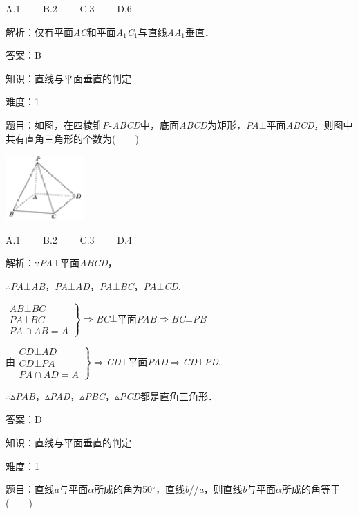 \documentclass{article} %
\begin{document}
A.1　　 B.2　　 C.3　　 D.6

解析：仅有平面\textit{AC}和平面\textit{A}${}_{1}$\textit{C}${}_{1}$与直线\textit{AA}${}_{1}$垂直．

答案：B

知识：直线与平面垂直的判定

难度：1

题目：如图，在四棱锥\textit{P}-\textit{ABCD}中，底面\textit{ABCD}为矩形，\textit{PA}$\mathrm{\bot}$平面\textit{ABCD}，则图中共有直角三角形的个数为(　　)

\includegraphics*[width=1.18in, height=0.98in, keepaspectratio=false]{image194}

A.1　　 B.2　　 C.3　　 D.4

解析：$\mathrm{\because}$\textit{PA}$\mathrm{\bot}$平面\textit{ABCD}，

$\mathrm{\therefore}$\textit{PA}$\mathrm{\bot}$\textit{AB}，\textit{PA}$\mathrm{\bot}$\textit{AD}，\textit{PA}$\mathrm{\bot}$\textit{BC}，\textit{PA}$\mathrm{\bot}$\textit{CD}.

$\left. \begin{array}{l}
AB\bot BC\\
PA\bot BC\\
PA \cap AB = A
\end{array}\right\} \mathrm{\Rightarrow }$\textit{BC}$\mathrm{\bot}$平面\textit{PAB}$\mathrm{\Rightarrow }$\textit{BC}$\mathrm{\bot}$\textit{PB}

由$\left.\begin{array}{r}
CD\bot AD\\
CD\bot PA\\
PA \cap AD = A
\end{array}\right\}\mathrm{\Rightarrow }$\textit{CD}$\mathrm{\bot}$平面\textit{PAD}$\mathrm{\Rightarrow }$\textit{CD}$\mathrm{\bot}$\textit{PD}.

$\mathrm{\therefore}$$\mathrm{\vartriangle}$\textit{PAB}，$\mathrm{\vartriangle}$\textit{PAD}，$\mathrm{\vartriangle}$\textit{PBC}，$\mathrm{\vartriangle}$\textit{PCD}都是直角三角形．

答案：D

知识：直线与平面垂直的判定

难度：1

题目：直线\textit{a}与平面\textit{$\alpha$}所成的角为50$\mathrm{{}^\circ}$，直线\textit{b}//\textit{a}，则直线\textit{b}与平面\textit{$\alpha$}所成的角等于(　　)
\end{document}
